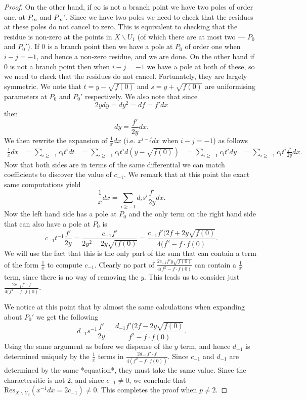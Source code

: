 \documentclass[draft, 11pt]{article} %
\theoremstyle{plain}
\theoremstyle{remark}
\begin{document}
\begin{proof}
On the other hand, if $\infty$ is not a branch point we have two poles of order one, at $P_\infty$ and $P_\infty'$.
Since we have two poles we need to check that the residues at these poles do not cancel to zero.
This is equivalent to checking that the residue is non-zero at the points in $X\backslash U_1$ (of which there are at most two --- $P_0$ and $P_0'$).
If 0 is a branch point then we have a pole at $P_0$ of order one when $i-j=-1$, and hence a non-zero residue, and we are done.
On the other hand if 0 is not a branch point then when $i-j=-1$ we have a pole at both of these, so we need to check that the residues do not cancel.
Fortunately, they are largely symmetric.
We note that $t=y-\sqrt{f(0)}$ and $s=y+\sqrt{f(0)}$ are uniformising parameters at $P_0$ and $P_0'$ respectively.
We also note that since
\[
2ydy = dy^2 = df = f'dx
\]
then
\[
dy=\frac{f'}{2y}dx.
\]
We then rewrite the expansion of $\frac{1}{x}dx$ (i.e. $x^{i-j}dx$ when $i-j=-1$) as follows
\begin{align*}
\frac{1}{x}dx & = \sum_{i\geq -1}c_it^i dt
& = \sum_{i\geq -1}c_it^i d(y-\sqrt{f(0)})
& = \sum_{i\geq -1}c_it^i dy
& = \sum_{i\geq -1}c_it^i \frac{f'}{2y}dx.
\end{align*}
Now that both sides are in terms of the same differential we can match coefficients to discover the value of $c_{-1}$.
We remark that at this point the exact same computations yield
\[
\frac{1}{x}dx = \sum_{i\geq -1}d_is^i \frac{f'}{2y}dx.
\]
Now the left hand side has a pole at $P_0$ and the only term on the right hand side that can also have a pole at $P_0$ is 
\[
c_{-1}t^{-1}\frac{f'}{2y} = \frac{c_{-1}f'}{2y^2 - 2y\sqrt{(f(0)}} = \frac{c_{-1}f'(2f+2y\sqrt{f(0)}}{4(f^2-f\cdot f(0)}.
\]
We will use the fact that this is the only part of the sum that can contain a term of the form $\frac{1}{x}$ to compute $c_{-1}$.
Clearly no part of $\frac{2c_{-1}f'y\sqrt{f(0)}}{4(f^2-f\cdot f(0)}$ can contain a $\frac{1}{x}$ term, since there is no way of removing the $y$.
This leads us to consider just $\frac{2c_{-1}f'\cdot f}{4(f^2-f\cdot f(0)}$.

We notice at this point that by almost the same calculations when expanding about $P_0'$ we get the following
\[
d_{-1}s^{-1}\frac{f'}{2y} = \frac{d_{-1}f'(2f-2y\sqrt{f(0)}}{f^2 - f\cdot f(0)}.
\]
Using the same argument as before we dispense of the $y$ term, and hence $d_{-1}$ is determined uniquely by the $\frac{1}{x}$ terms in $\frac{2d_{-1}f' \cdot f}{4(f^2-f\cdot f(0))}$.
Since $c_{-1}$ and $d_{-1}$ are determined by the same *equation*, they must take the same value. 
Since the charactersitic is not 2, and since $c_{-1} \neq 0$, we conclude that $\text{Res}_{X\backslash U_2}(x^{-1}dx = 2c_{-1} )\neq 0$.
This completes the proof when $p \neq 2$.


\end{proof}
\end{document}
